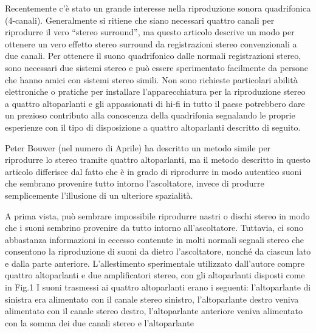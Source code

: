 \documentclass[11pt]{article}
\begin{document}
\begin{multicols*}{2}
\parskip=0pt

Recentemente c’è stato un grande interesse nella riproduzione sonora quadrifonica (4-canali). Generalmente si ritiene che siano necessari quattro canali per riprodurre il vero “stereo surround”, ma questo articolo descrive un modo per ottenere un vero effetto stereo surround da registrazioni stereo convenzionali a due canali. Per ottenere il suono quadrifonico dalle normali registrazioni stereo, sono necessari due sistemi stereo e può essere sperimentato facilmente da persone che hanno amici con sistemi stereo simili. Non sono richieste particolari abilità elettroniche o pratiche per installare l’apparecchiatura per la riproduzione stereo a quattro altoparlanti e gli appassionati di hi-fi in tutto il paese potrebbero dare un prezioso contributo alla conoscenza della quadrifonia segnalando le proprie esperienze con il tipo di disposizione a quattro altoparlanti descritto di seguito.

Peter Bouwer (nel numero di Aprile) ha descritto un metodo simile per riprodurre lo stereo tramite quattro altoparlanti, ma il metodo descritto in questo articolo differisce dal fatto che è in grado di riprodurre in modo autentico suoni che sembrano provenire tutto intorno l’ascoltatore, invece di produrre semplicemente l’illusione di un ulteriore spazialità.

A prima vista, può sembrare impossibile riprodurre nastri o dischi stereo in modo che i suoni sembrino provenire da tutto intorno all’ascoltatore. Tuttavia, ci sono abbastanza informazioni in eccesso contenute in molti normali segnali stereo che consentono la riproduzione di suoni da dietro l’ascoltatore, nonché da ciascun lato e dalla parte anteriore. L’allestimento sperimentale utilizzato dall’autore compre quattro altoparlanti e due amplificatori stereo, con gli altoparlanti disposti come in Fig.1 I suoni trasmessi ai quattro altoparlanti erano i seguenti: l’altoparlante di sinistra era alimentato con il canale stereo sinistro, l’altoparlante destro veniva alimentato con il canale stereo destro, l’altoparlante anteriore veniva alimentato con la somma dei due canali stereo e l’altoparlante 


\end{multicols*}
\end{document}
